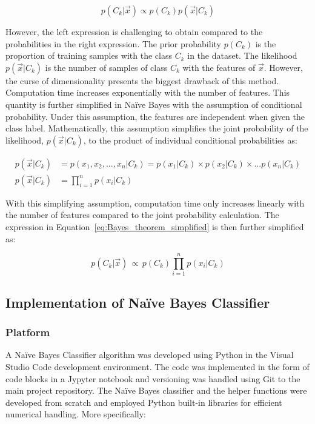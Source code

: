 \documentclass[a4paper]{article}
\begin{document}
\begin{equation} \label{eq:Bayes_theorem_simplified}
    p(C_k|\vec{x}) \propto p(C_k)p(\vec{x}|C_k)
\end{equation}

However, the left expression is challenging to obtain compared to the probabilities in the right expression. The prior probability $p(C_k)$ is the proportion of training samples with the class $C_k$ in the dataset. The likelihood $p(\vec x|C_k)$ is the number of samples of class $C_k$ with the features of $\vec x$. However, the curse of dimensionality presents the biggest drawback of this method. Computation time increases exponentially with the number of features. This quantity is further simplified in Naïve Bayes with the assumption of conditional probability. Under this assumption, the features are independent when given the class label. Mathematically, this assumption simplifies the joint probability of the likelihood, $p(\vec x|C_k)$, to the product of individual conditional probabilities as:

\begin{equation}
\begin{aligned}
    p(\vec x|C_k) &= p(x_1, x_2 , ... , x_n|C_k) = p(x_1|C_k)\times p(x_2|C_k) \times ... p(x_n|C_k) \\
    p(\vec x|C_k) &= \prod_{i=1}^n p(x_i|C_k)
\end{aligned}
\end{equation}

With this simplifying assumption, computation time only increases linearly with the number of features compared to the joint probability calculation. The expression in Equation~\ref{eq:Bayes_theorem_simplified} is then further simplified as:

\begin{equation}
     p(C_k|\vec{x}) \, \propto \, p(C_k) \prod_{i=1}^n p(x_i|C_k)
\end{equation}

\subsection{Implementation of Naïve Bayes Classifier}

\subsubsection{Platform} \label{subsubsec:platform}

A Naïve Bayes Classifier algorithm was developed using Python in the Visual Studio Code development environment. The code was implemented in the form of code blocks in a Jypyter notebook and versioning was handled using Git to the main project repository. The Naïve Bayes classifier and the helper functions were developed from scratch and employed Python built-in libraries for efficient numerical handling. More specifically:
\end{document}
